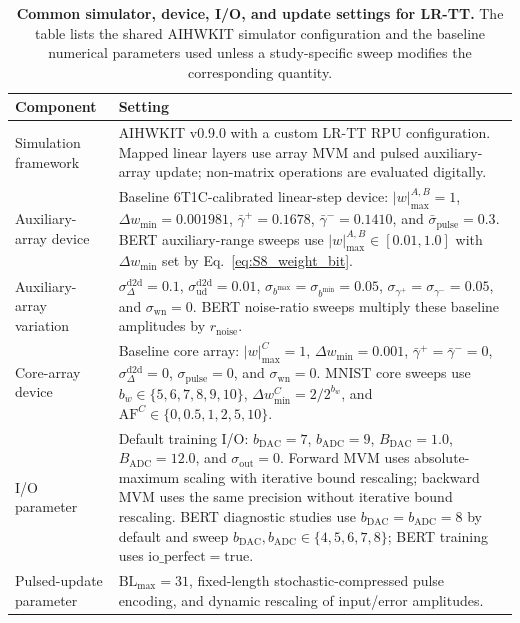 \documentclass[AMA,LATO1COL]{WileyNJDv5}
\begin{document}
\begin{table}[H]
\centering
\caption{\textbf{Common simulator, device, I/O, and update settings for LR-TT.}
The table lists the shared AIHWKIT simulator configuration and the baseline numerical parameters used unless a study-specific sweep modifies the corresponding quantity.}
\label{tab:S8_hardware_simulator}
\small
\renewcommand{\arraystretch}{1.10}
\setlength{\tabcolsep}{4.0pt}
\begin{tabularx}{\linewidth}{p{3.0cm}Y}
\toprule
{}
\textbf{Component} & \textbf{Setting} \\
\midrule
Simulation framework &
AIHWKIT v0.9.0 with a custom LR-TT RPU configuration. Mapped linear layers use array MVM and pulsed auxiliary-array update; non-matrix operations are evaluated digitally. \\
\midrule
Auxiliary-array device &
Baseline 6T1C-calibrated linear-step device: \(|w|_{\max}^{A,B}=1\), \(\Delta w_{\min}=0.001981\), \(\bar{\gamma}^{+}=0.1678\), \(\bar{\gamma}^{-}=0.1410\), and \(\bar{\sigma}_{\mathrm{pulse}}=0.3\). BERT auxiliary-range sweeps use \(|w|_{\max}^{A,B}\in[0.01,1.0]\) with \(\Delta w_{\min}\) set by Eq.~\eqref{eq:S8_weight_bit}. \\
\midrule
Auxiliary-array variation &
\(\sigma_{\Delta}^{\mathrm{d2d}}=0.1\), \(\sigma_{\mathrm{ud}}^{\mathrm{d2d}}=0.01\), \(\sigma_{b^{\max}}=\sigma_{b^{\min}}=0.05\), \(\sigma_{\gamma^{+}}=\sigma_{\gamma^{-}}=0.05\), and \(\sigma_{\mathrm{wn}}=0\). BERT noise-ratio sweeps multiply these baseline amplitudes by \(r_{\mathrm{noise}}\). \\
\midrule
Core-array device &
Baseline core array: \(|w|_{\max}^{C}=1\), \(\Delta w_{\min}=0.001\), \(\bar{\gamma}^{+}=\bar{\gamma}^{-}=0\), \(\sigma_{\Delta}^{\mathrm{d2d}}=0\), \(\sigma_{\mathrm{pulse}}=0\), and \(\sigma_{\mathrm{wn}}=0\). MNIST core sweeps use \(b_w\in\{5,6,7,8,9,10\}\), \(\Delta w_{\min}^{C}=2/2^{b_w}\), and \(\mathrm{AF}^{C}\in\{0,0.5,1,2,5,10\}\). \\
\midrule
I/O parameter &
Default training I/O: \(b_{\mathrm{DAC}}=7\), \(b_{\mathrm{ADC}}=9\), \(B_{\mathrm{DAC}}=1.0\), \(B_{\mathrm{ADC}}=12.0\), and \(\sigma_{\mathrm{out}}=0\). Forward MVM uses absolute-maximum scaling with iterative bound rescaling; backward MVM uses the same precision without iterative bound rescaling. BERT diagnostic studies use \(b_{\mathrm{DAC}}=b_{\mathrm{ADC}}=8\) by default and sweep \(b_{\mathrm{DAC}},b_{\mathrm{ADC}}\in\{4,5,6,7,8\}\); BERT training uses \(\mathrm{io\_perfect}=\mathrm{true}\). \\
\midrule
Pulsed-update parameter &
\(\mathrm{BL}_{\max}=31\), fixed-length stochastic-compressed pulse encoding, and dynamic rescaling of input/error amplitudes. \\
\bottomrule
\end{tabularx}
\end{table}
\FloatBarrier
\end{document}
